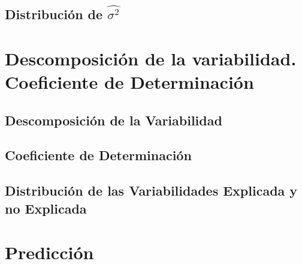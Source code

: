 \documentclass[10pt,a4paper]{book}
\begin{document}
		\subsection{Distribución de $\widehat{\sigma^2}$}
	\section{Descomposición de la variabilidad. Coeficiente de Determinación}
		\subsection{Descomposición de la Variabilidad}
		\subsection{Coeficiente de Determinación}
		\subsection{Distribución de las Variabilidades Explicada y no Explicada}
	\section{Predicción}
\end{document}
